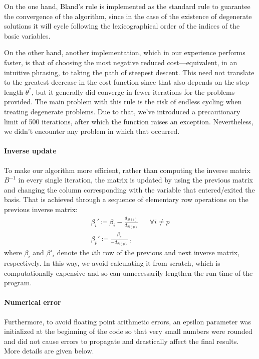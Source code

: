 \documentclass[a4paper]{article}
\begin{document}
On the one hand, Bland's rule is implemented as the standard rule to guarantee the convergence of the algorithm, since in the case of the existence of degenerate solutions it will cycle following the lexicographical order of the indices of the basic variables.

On the other hand, another implementation, which in our experience performs faster, is that of choosing the most negative reduced cost---equivalent, in an intuitive phrasing, to taking the path of steepest descent. This need not translate to the greatest decrease in the cost function since that also depends on the step length $\theta^\ast$, but it generally did converge in fewer iterations for the problems provided. The main problem with this rule is the risk of endless cycling when treating degenerate problems. Due to that, we've introduced a precautionary limit of 500 iterations, after which the function raises an exception. Nevertheless, we didn't encounter any problem in which that occurred.

\paragraph{Inverse update} To make our algorithm more efficient, rather than computing the inverse matrix ${B}^{-1}$ in every single iteration, the matrix is updated by using the previous matrix and changing the column corresponding with the variable that entered/exited the basis. That is achieved through a sequence of elementary row operations on the previous inverse matrix:
\begin{align*}
    \beta_i' \coloneqq \beta_i - \frac{d_{\mathcal{B}(i)}}{d_{\mathcal{B}(p)}} && \forall i \ne p \\
    \beta_p' \coloneqq \frac{\beta_p}{-d_{\mathcal{B}(p)}}\,, &&
\end{align*}
where $\beta_i$ and $\beta'_i$ denote the $i$th row of the previous and next inverse matrix, respectively. In this way, we avoid calculating it from scratch, which is computationally expensive and so can unnecessarily lengthen the run time of the program.

\paragraph{Numerical error} Furthermore, to avoid floating point arithmetic errors, an epsilon parameter was initialized at the beginning of the code so that very small numbers were rounded and did not cause errors to propagate and drastically affect the final results. More details are given below.
\end{document}
